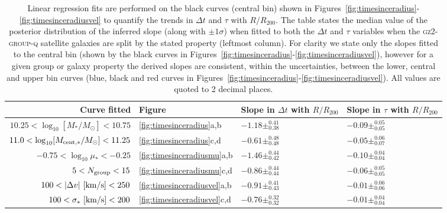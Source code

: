 \documentclass[useAMS,usenatbib]{mn2e}
\begin{document}
\begin{table}

\centering
\caption{Linear regression fits are performed on the black curves (central bin) shown in Figures~\ref{fig:timesinceradius}-\ref{fig:timesinceradiusvel} to quantify the trends in $\Delta t$ and $\tau$ with $R/R_{200}$. The table states the median value of the posterior distribution of the inferred slope (along with $\pm1\sigma$) when fitted to both the $\Delta t$ and $\tau$ variables when the \textsc{gz2-group-q} satellite galaxies are split by the stated property (leftmost column). For clarity we state only the slopes fitted to the central bin (shown by the black curves in Figures~\ref{fig:timesinceradius}-\ref{fig:timesinceradiusvel}), however for a given group or galaxy property the derived slopes are consistent, within the uncertainties, between the lower, central and upper bin curves (blue, black and red curves in Figures~\ref{fig:timesinceradius}-\ref{fig:timesinceradiusvel}). All values are quoted to 2 decimal places.}
\label{table:resultsum}
%
%
%
\setlength\extrarowheight{3pt}
\begin{tabularx}{\textwidth}{r|C|C|C}

\hline
Curve fitted & Figure & Slope in $\Delta t$ with $R/R_{200}$        & Slope in $\tau$ with $R/R_{200}$            \\ \hline 
$10.25 < \log_{10}[M_*/M_{\odot}] < 10.75$                 & \ref{fig:timesinceradius}a,b           & $-1.18\pm_{0.38}^{0.41}$ & $-0.09\pm_{0.05}^{0.05}$ \\
$11.0 < \log_{10}[M_{\rm{cent},*}/M_{\odot}] < 11.25$     & \ref{fig:timesinceradius}c,d           & $-0.61\pm_{0.48}^{0.48}$ & $-0.05\pm_{0.07}^{0.06}$ \\
$-0.75 < \log_{10}\mu_* < -0.25$               & \ref{fig:timesinceradiusmu}a,b         & $-1.46\pm_{0.42}^{0.44}$ & $-0.10\pm_{0.04}^{0.04}$ \\
$5 < N_{\rm{group}}< 15$      & \ref{fig:timesinceradiusmu}c,d         & $-0.86\pm_{0.44}^{0.44}$ & $-0.06\pm_{0.05}^{0.05}$ \\
$100 < |\Delta v|~[\rm{km/s}] < 250$          & \ref{fig:timesinceradiusvel}a,b        & $-0.91\pm_{0.43}^{0.41}$ & $-0.01\pm_{0.06}^{0.06}$ \\
$100 < \sigma_*~[\rm{km/s}] < 200$            & \ref{fig:timesinceradiusvel}c,d        & $-0.76\pm_{0.32}^{0.32}$ & $-0.01\pm_{0.04}^{0.04}$ \\ \hline
\end{tabularx}
\end{table}
\end{document}
